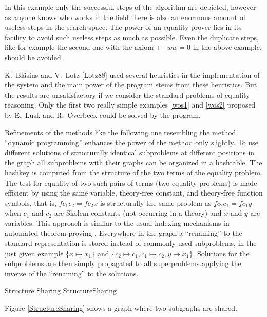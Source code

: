 In this example only the successful steps of the algorithm are depicted,
however as anyone knows who works in the field there is also 
an enormous amount of useless steps in the search space. The power 
of an equality prover lies in its
facility to avoid such useless steps as much as possible. Even the 
duplicate steps, like for example the second one
with the axiom $+$$-$$ww=0$ in the above example, should be avoided.

K.\ Bl\"asius and V.\ Lotz [Lotz88] used several heuristics in the 
implementation of the system and the main power of the program stems from
these heuristics. But the results are unsatisfactory if we consider the
standard problems of equality reasoning. Only the first two really simple
examples \ref{wos1} and \ref{wos2}
proposed by E.\ Lusk and R.\ Overbeek \cite{LuOv84} could be solved by the
program.

Refinements of the methods like the following one resembling the method 
``dynamic programming'' enhances the power of the method only slightly. 
To use different solutions of structurally identical
subproblems at different positions in the graph all 
subproblems with their graphs can be organized in a hashtable.
The hashkey is computed from the structure of the two terms of the equality
problem. The test for equality of two such pairs of terms (two equality
problems) is made efficient by
using the same variable, theory-free constant, and theory-free
function symbols, that is,
$fc_1c_2=fc_2x$ is structurally the same problem as $fc_2c_1=fc_1y$ when
$c_1$ and $c_2$ are Skolem constants (not occurring in a theory) and $x$
and $y$ are variables. This
approach is similar to the usual indexing mechanisms in automated theorem
proving \cite{OvLu80,Ohlbach89}. Everywhere in the graph 
a ``renaming'' to the standard representation is stored
instead of commonly used subproblems, 
in the just given example \{$x\mapsto x_1$\} and 
\{$c_2\mapsto c_1, c_1\mapsto c_2, y\mapsto x_1$\}.
Solutions for the subproblems are then simply propagated to all
superproblems applying the inverse of the ``renaming'' to the solutions.

%
{Structure Sharing}%
{StructureSharing}

\begin{Ex}
\label{Structuresharing1}
\return
Figure \ref{StructureSharing} shows a graph where two subgraphs are shared.
\end{Ex}

